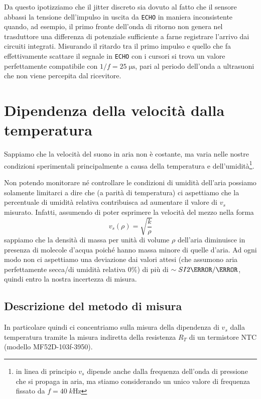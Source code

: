 \documentclass[10pt, a4paper, italian]{article}
\begin{document}
Da questo ipotizziamo che il jitter discreto sia dovuto al fatto che il
sensore abbassi la tensione dell'impulso in uscita da \verb+ECHO+ in maniera
inconsistente quando, ad esempio, il primo fronte dell'onda di ritorno non
genera nel trasduttore una differenza di potenziale sufficiente a farne
registrare l'arrivo dai circuiti integrati.
Misurando il ritardo tra il primo impulso e quello che fa effettivamente
scattare il segnale in \verb+ECHO+ con i cursori si trova un valore
perfettamente compatibile con $1/f = 25 \; \si{\micro\s}$, pari al
periodo dell'onda a ultrasuoni che non viene percepita dal ricevitore.

\section{Dipendenza della velocità dalla temperatura}
Sappiamo che la velocità del suono in aria non è costante, ma varia nelle
nostre condizioni sperimentali principalmente a causa della temperatura e
dell'umidità\footnote{in linea di principio $v_s$ dipende anche dalla
frequenza dell'onda di pressione che si propaga in aria, ma stiamo
considerando un unico valore di frequenza fissato da $f = 40 \; \si{k\Hz}$}.

Non potendo monitorare né controllare le condizioni di umidità dell'aria
possiamo solamente limitarci a dire che (a parità di temperatura) ci
aspettiamo che la percentuale di umidità relativa contribuisca ad aumentare
il valore di $v_s$ misurato. Infatti, assumendo di poter esprimere la velocità
del mezzo nella forma
\begin{equation}
v_s(\rho) = \sqrt{\frac{k}{\rho}}
\end{equation}
sappiamo che la densità di massa per unità di volume $\rho$ dell'aria
diminuisce in presenza di molecole d'acqua poiché hanno massa minore di quelle
d'aria. Ad ogni modo non ci aspettiamo una deviazione dai valori attesi
(che assumono aria perfettamente secca/di umidità relativa $0 \percent$) di più
di $\sim SI{2}{\m/\s}$, quindi entro la nostra incertezza di misura.

\subsection{Descrizione del metodo di misura}
In particolare quindi ci concentriamo sulla misura della dipendenza di $v_s$
dalla temperatura tramite la misura indiretta della resistenza $R_T$ di un
termistore NTC (modello MF52D-103f-3950).
\end{document}
